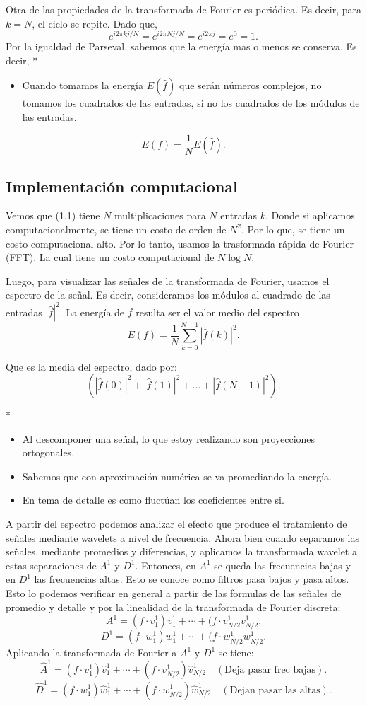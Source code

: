 \begin{paracol}{2}
Otra de las propiedades de la transformada de Fourier es periódica. Es decir, para $k=N$, el ciclo se repite. Dado que, 
$$e^{i2\pi kj/N}=e^{i2\pi Nj/N}=e^{i2\pi j}=e^0=1.$$
Por la igualdad de Parseval, sabemos que la energía mas o menos se conserva. Es decir,
\switchcolumn[1]*{\noindent\scriptsize
    \begin{itemize}
	\item Cuando tomamos la energía $E(\hat{f})$ que serán números complejos, no tomamos los cuadrados de las entradas, si no los cuadrados de los módulos de las entradas.
    \end{itemize}
}
\switchcolumn[0]\noindent
$$E(f)=\dfrac{1}{N}E(\hat{f}).$$

\subsection{Implementación computacional}
Vemos que (1.1) tiene $N$ multiplicaciones para $N$ entradas $k$. Donde si aplicamos computacionalmente, se tiene un costo de orden de $N^2$. Por lo que, se tiene un costo computacional alto. Por lo tanto, usamos la trasformada rápida de Fourier (FFT). La cual tiene un costo computacional de $N\log N$.

Luego, para visualizar las señales de la transformada de Fourier, usamos el espectro de la señal. Es decir, consideramos los módulos al cuadrado de las entradas $|\hat{f}|^2$. La energía de $f$ resulta ser el valor medio del espectro
$$E(f)=\dfrac{1}{N}\sum_{k=0}^{N-1}|\hat{f}(k)|^2.$$

Que es la media del espectro, dado por:
$$\left(|\hat{f}(0)|^2+|\hat{f}(1)|^2+\ldots+|\hat{f}(N-1)|^2\right).$$

\switchcolumn[1]*{\noindent\scriptsize
	\begin{itemize}
	    \item Al descomponer una señal, lo que estoy realizando son proyecciones ortogonales.
	    \item Sabemos que con aproximación numérica se va promediando la energía.
	    \item En tema de detalle es como fluctúan los coeficientes entre si.
	\end{itemize}
}
A partir del espectro podemos analizar el efecto que produce el tratamiento de señales mediante wavelets a nivel de frecuencia.
\switchcolumn[0]
Ahora bien cuando separamos las señales, mediante promedios y diferencias, y aplicamos la transformada wavelet a estas separaciones de $A^1$ y $D^1$. Entonces, en $A^1$ se queda las frecuencias bajas y en $D^1$ las frecuencias altas. Esto se conoce como filtros pasa bajos y pasa altos. Esto lo podemos verificar en general a partir de las formulas de las señales de promedio y detalle y por la linealidad de la transformada de Fourier discreta:
$$A^1 = (f\cdot v_1^1)v_1^1 + \cdots + (f\cdot v^1_{N/2}v^1_{N/2}.$$
$$D^1 = (f\cdot w_1^1)w_1^1 + \cdots + (f\cdot w^1_{N/2}w^1_{N/2}.$$
Aplicando la transformada de Fourier a $A^1$ y $D^1$ se tiene:
$$\hat{A}^1 = (f\cdot v_1^1)\hat{v}_1^1 + \cdots + (f\cdot v^1_{N/2})\hat{v}^1_{N/2} \quad (\text{Deja pasar frec bajas}).$$
$$\hat{D}^1 = (f\cdot w_1^1)\hat{w}_1^1 + \cdots + (f\cdot w^1_{N/2})\hat{w}^1_{N/2} \quad (\text{Dejan pasar las altas}).$$



\end{paracol}
